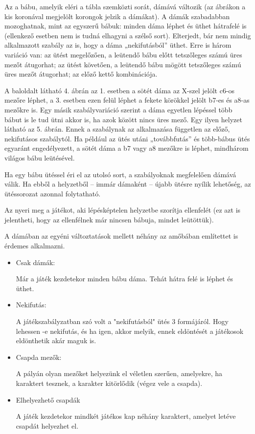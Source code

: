 Az a bábu, amelyik eléri a tábla szemközti sorát, dámává változik (az ábrákon a kis koronával megjelölt korongok jelzik a dámákat). A dámák szabadabban mozoghatnak, mint az egyszerű bábuk: minden dáma léphet és üthet hátrafelé is (ellenkező esetben nem is tudná elhagyni a szélső sort).
Elterjedt, bár nem mindig alkalmazott szabály az is, hogy a dáma „nekifutásból” üthet. Erre is három variáció van:
az ütést megelőzően, a leütendő bábu előtt tetszőleges számú üres mezőt átugorhat;
az ütést követően, a leütendő bábu mögött tetszőleges számú üres mezőt átugorhat;
az előző kettő kombinációja.

A baloldalt látható 4. ábrán az 1. esetben a sötét dáma az X-szel jelölt c6-os mezőre léphet, a 3. esetben ezen felül léphet a fekete körökkel jelölt b7-es és a8-as mezőkre is.
Egy másik szabályvariáció szerint a dáma egyetlen lépéssel több bábut is le tud ütni akkor is, ha azok között nincs üres mező. Egy ilyen helyzet látható az 5. ábrán. Ennek a szabálynak az alkalmazása független az előző, nekifutásos szabálytól. Ha például az ütés utáni „továbbfutás” és több-bábus ütés egyaránt engedélyezett, a sötét dáma a b7 vagy a8 mezőkre is léphet, mindhárom világos bábu leütésével.

Ha egy bábu ütéssel éri el az utolsó sort, a szabályoknak megfelelően dámává válik. Ha ebből a helyzetből – immár dámaként – újabb ütésre nyílik lehetőség, az ütéssorozat azonnal folytatható.

Az nyeri meg a játékot, aki lépésképtelen helyzetbe szorítja ellenfelét (ez azt is jelentheti, hogy az ellenfélnek már nincsen bábuja, mindet leütöttük).


A dámában az egyéni változtatások mellett néhány az amőbában említettet is érdemes alkalmazni.
\begin{itemize}
	\item Csak dámák:
	
	Már a játék kezdetekor minden bábu dáma. Tehát hátra felé is léphet és üthet.
	\item Nekifutás:
	
	A játékszabályzatban szó volt a "nekifutásból" ütés 3 formájáról. Hogy lehessen -e nekifutás, és ha igen, akkor melyik, ennek eldöntését a játékosok eldönthetik akár maguk is.
	
	\item Csapda mezők:
	
	A pályán olyan mezőket helyezünk el véletlen szerűen, amelyekre, ha karaktert tesznek, a karakter kitörlődik (végez vele a csapda).
	
	\item Elhelyezhető csapdák
	
	A játék kezdetekor mindkét játékos kap néhány karaktert, amelyet letéve csapdát helyezhet el.	
\end{itemize}


